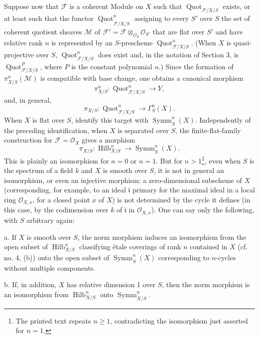 Suppose now that $\mathcal F$ is a coherent Module on $X$ such that
$\operatorname{Quot}_{\mathcal F/X/S}$ exists, or at least such that the
functor $\underline{\operatorname{Quot}}^n_{\mathcal F/X/S}$ assigning to every
$S'$ over $S$ the set of coherent quotient sheaves $\mathcal M$ of
$\mathcal F'=\mathcal F\otimes_{\mathcal O_S}\mathcal O_{S'}$ that are flat
over $S'$ and have relative rank $n$ is represented by an $S$-prescheme
$\operatorname{Quot}^n_{\mathcal F/X/S}$. (When $X$ is quasi-projective over
$S$, $\operatorname{Quot}^n_{\mathcal F/X/S}$ does exist and, in the notation
of Section 3, is $\operatorname{Quot}^P_{\mathcal F/X/S}$, where $P$ is the
constant polynomial $n$.) Since the formation of
$\pi^u_{X/S}(\mathcal M)$ is compatible with base change, one obtains a
canonical morphism
\[
\pi^u_{X/S}:\operatorname{Quot}^n_{\mathcal F/X/S}\longrightarrow Y,
\]
and, in general, \[ \pi_{X/S}:\operatorname{Quot}^n_{\mathcal F/X/S} \longrightarrow\Gamma^n_S(X). \] When $X$ is flat over $S$, identify this target with $\operatorname{Symm}^n_S(X)$.
Independently of the preceding identification, when $X$ is separated over $S$, the finite-flat-family construction for $\mathcal F=\mathcal O_X$ gives a morphism
\[
\pi_{X/S}:\operatorname{Hilb}^n_{X/S}
\longrightarrow\operatorname{Symm}^n_S(X).
\]
This is plainly an isomorphism for $n=0$ or $n=1$. But for
$n>1$\footnote{The printed text repeats $n\geq1$, contradicting the
isomorphism just asserted for $n=1$.}, even when
$S$ is the spectrum of a field $k$ and $X$ is smooth over $S$, it is not in
general an isomorphism, or even an injective morphism: a zero-dimensional
subscheme of $X$ (corresponding, for example, to an ideal $\mathfrak i$
primary for the maximal ideal in a local ring $\mathcal O_{X,x}$, for a closed
point $x$ of $X$) is not determined by the cycle it defines (in this case, by
the codimension over $k$ of $\mathfrak i$ in $\mathcal O_{X,x}$). One can say
only the following, with $S$ arbitrary again:

\medskip
\noindent a. If $X$ is smooth over $S$, the norm morphism induces an
isomorphism from the open subset of $\operatorname{Hilb}^n_{X/S}$ classifying
étale coverings of rank $n$ contained in $X$ (cf. no. 4, (b)) onto the open
subset of $\operatorname{Symm}^n_S(X)$ corresponding to $n$-cycles without
multiple components.

\medskip
\noindent b. If, in addition, $X$ has relative dimension 1 over $S$, then the
norm morphism is an isomorphism from $\operatorname{Hilb}^n_{X/S}$ onto
$\operatorname{Symm}^n_{X/S}$.

